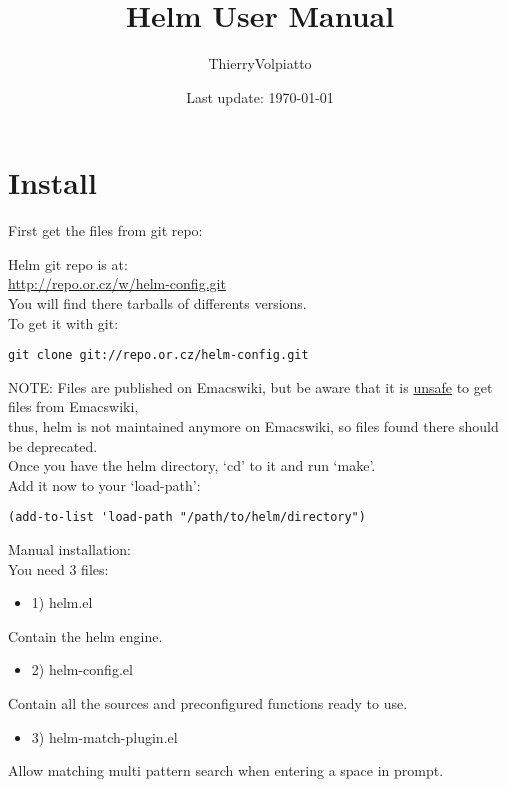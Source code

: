 \documentclass[a4paper,11pt]{article}
\begin{document}
\begin{titlepage}
\title{Helm User Manual}
\date{Last update: \today}
\author{ThierryVolpiatto}
\maketitle
\tableofcontents
\end{titlepage}

\section{Install}
\label{sec:install}

First get the files from git repo:

Helm git repo is at:\\
\url{http://repo.or.cz/w/helm-config.git}\\
You will find there tarballs of differents versions.\\

To get it with git:
\begin{verbatim}
git clone git://repo.or.cz/helm-config.git
\end{verbatim}
NOTE: Files are published on Emacswiki, but be aware that it is \underline{unsafe} to get files from Emacswiki,\\
thus, helm is not maintained anymore on Emacswiki, so files found there should be deprecated.\\

Once you have the helm directory, `cd' to it and run `make'.\\
Add it now to your `load-path':
\begin{verbatim}
(add-to-list 'load-path "/path/to/helm/directory")
\end{verbatim}


Manual installation:\\
          
You need 3 files:
\begin{itemize}
\item 1) helm.el
\end{itemize}
Contain the helm engine.

\begin{itemize}
\item 2) helm-config.el
\end{itemize}
Contain all the sources and preconfigured functions ready to use.

\begin{itemize}
\item 3) helm-match-plugin.el
\end{itemize}
Allow matching multi pattern search when entering a space in prompt.
\end{document}
